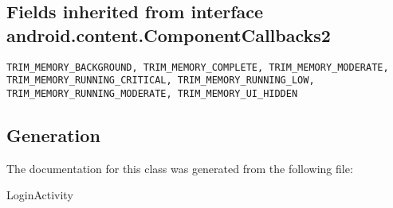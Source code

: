 \subsection{Fields inherited from interface android.content.ComponentCallbacks2}


\begin{lstlisting}
TRIM_MEMORY_BACKGROUND, TRIM_MEMORY_COMPLETE, TRIM_MEMORY_MODERATE, TRIM_MEMORY_RUNNING_CRITICAL, TRIM_MEMORY_RUNNING_LOW, TRIM_MEMORY_RUNNING_MODERATE, TRIM_MEMORY_UI_HIDDEN
\end{lstlisting}

\subsection{Generation}
The documentation for this class was generated from the following file\-:
\begin{DoxyCompactItemize}
\item LoginActivity
\end{DoxyCompactItemize} 









